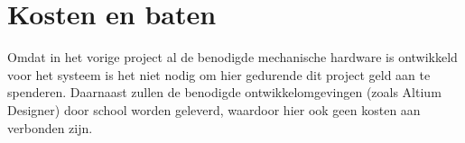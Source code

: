 \chapter{Kosten en baten}

Omdat in het vorige project al de benodigde mechanische hardware is ontwikkeld
voor het systeem is het niet nodig om hier gedurende dit project geld aan te
spenderen. Daarnaast zullen de benodigde ontwikkelomgevingen (zoals Altium
Designer) door school worden geleverd, waardoor hier ook geen kosten aan
verbonden zijn.
